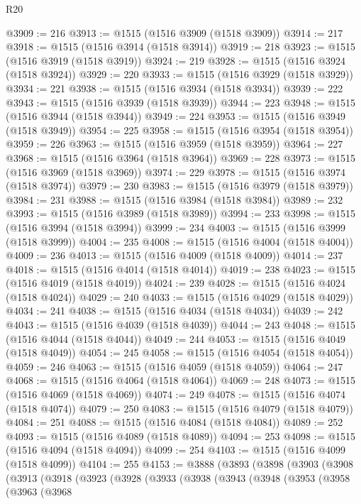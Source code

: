 \begin{lexlean}{R20}
\begin{coremodule}
{@3909 := 216
@3913 := @1515 (@1516 @3909 (@1518 @3909))
@3914 := 217
@3918 := @1515 (@1516 @3914 (@1518 @3914))
@3919 := 218
@3923 := @1515 (@1516 @3919 (@1518 @3919))
@3924 := 219
@3928 := @1515 (@1516 @3924 (@1518 @3924))
@3929 := 220
@3933 := @1515 (@1516 @3929 (@1518 @3929))
@3934 := 221
@3938 := @1515 (@1516 @3934 (@1518 @3934))
@3939 := 222
@3943 := @1515 (@1516 @3939 (@1518 @3939))
@3944 := 223
@3948 := @1515 (@1516 @3944 (@1518 @3944))
@3949 := 224
@3953 := @1515 (@1516 @3949 (@1518 @3949))
@3954 := 225
@3958 := @1515 (@1516 @3954 (@1518 @3954))
@3959 := 226
@3963 := @1515 (@1516 @3959 (@1518 @3959))
@3964 := 227
@3968 := @1515 (@1516 @3964 (@1518 @3964))
@3969 := 228
@3973 := @1515 (@1516 @3969 (@1518 @3969))
@3974 := 229
@3978 := @1515 (@1516 @3974 (@1518 @3974))
@3979 := 230
@3983 := @1515 (@1516 @3979 (@1518 @3979))
@3984 := 231
@3988 := @1515 (@1516 @3984 (@1518 @3984))
@3989 := 232
@3993 := @1515 (@1516 @3989 (@1518 @3989))
@3994 := 233
@3998 := @1515 (@1516 @3994 (@1518 @3994))
@3999 := 234
@4003 := @1515 (@1516 @3999 (@1518 @3999))
@4004 := 235
@4008 := @1515 (@1516 @4004 (@1518 @4004))
@4009 := 236
@4013 := @1515 (@1516 @4009 (@1518 @4009))
@4014 := 237
@4018 := @1515 (@1516 @4014 (@1518 @4014))
@4019 := 238
@4023 := @1515 (@1516 @4019 (@1518 @4019))
@4024 := 239
@4028 := @1515 (@1516 @4024 (@1518 @4024))
@4029 := 240
@4033 := @1515 (@1516 @4029 (@1518 @4029))
@4034 := 241
@4038 := @1515 (@1516 @4034 (@1518 @4034))
@4039 := 242
@4043 := @1515 (@1516 @4039 (@1518 @4039))
@4044 := 243
@4048 := @1515 (@1516 @4044 (@1518 @4044))
@4049 := 244
@4053 := @1515 (@1516 @4049 (@1518 @4049))
@4054 := 245
@4058 := @1515 (@1516 @4054 (@1518 @4054))
@4059 := 246
@4063 := @1515 (@1516 @4059 (@1518 @4059))
@4064 := 247
@4068 := @1515 (@1516 @4064 (@1518 @4064))
@4069 := 248
@4073 := @1515 (@1516 @4069 (@1518 @4069))
@4074 := 249
@4078 := @1515 (@1516 @4074 (@1518 @4074))
@4079 := 250
@4083 := @1515 (@1516 @4079 (@1518 @4079))
@4084 := 251
@4088 := @1515 (@1516 @4084 (@1518 @4084))
@4089 := 252
@4093 := @1515 (@1516 @4089 (@1518 @4089))
@4094 := 253
@4098 := @1515 (@1516 @4094 (@1518 @4094))
@4099 := 254
@4103 := @1515 (@1516 @4099 (@1518 @4099))
@4104 := 255
@4153 := @3888
    (@3893
      (@3898
        (@3903
          (@3908
            (@3913
              (@3918
                (@3923
                  (@3928
                    (@3933
                      (@3938
                        (@3943
                          (@3948
                            (@3953
                              (@3958
                                (@3963
                                  (@3968
}
\end{coremodule}
\end{lexlean}
